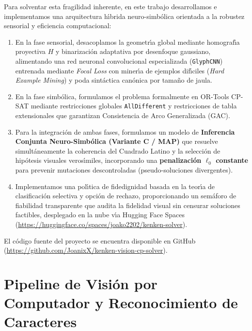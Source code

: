 \documentclass[conference]{IEEEtran}
\begin{document}
Para solventar esta fragilidad inherente, en este trabajo desarrollamos e implementamos una arquitectura h\'{\i}brida neuro-simb\'olica orientada a la robustez sensorial y eficiencia computacional:
\begin{enumerate}
    \item En la fase sensorial, desacoplamos la geometr\'{\i}a global mediante homograf\'{\i}a proyectiva $H$ y binarizaci\'on adaptativa por desenfoque gaussiano, alimentando una red neuronal convolucional especializada (\texttt{GlyphCNN}) entrenada mediante \textit{Focal Loss} con miner\'{\i}a de ejemplos dif\'{\i}ciles (\textit{Hard Example Mining}) y poda sint\'actica can\'onica por tama\~no de jaula.
    \item En la fase simb\'olica, formulamos el problema formalmente en OR-Tools CP-SAT mediante restricciones globales \texttt{AllDifferent} y restricciones de tabla extensionales que garantizan Consistencia de Arco Generalizada (GAC).
    \item Para la integraci\'on de ambas fases, formulamos un modelo de \textbf{Inferencia Conjunta Neuro-Simb\'olica (Variante C / MAP)} que resuelve simult\'aneamente la coherencia del Cuadrado Latino y la selecci\'on de hip\'otesis visuales veros\'{\i}miles, incorporando una \textbf{penalizaci\'on $\ell_0$ constante} para prevenir mutaciones descontroladas (pseudo-soluciones divergentes).
    \item Implementamos una pol\'{\i}tica de fidedignidad basada en la teor\'{\i}a de clasificaci\'on selectiva y opci\'on de rechazo, proporcionando un sem\'aforo de fiabilidad transparente que audita la fidelidad visual sin censurar soluciones factibles, desplegado en la nube v\'{\i}a Hugging Face Spaces (\url{https://huggingface.co/spaces/joako2202/kenken-solver}).
\end{enumerate}

El c\'odigo fuente del proyecto se encuentra disponible en GitHub (\url{https://github.com/JoanixX/kenken-vision-cp-solver}).

\section{Pipeline de Visi\'on por Computador y Reconocimiento de Caracteres}
\label{sec:vision_pipeline}
\end{document}
